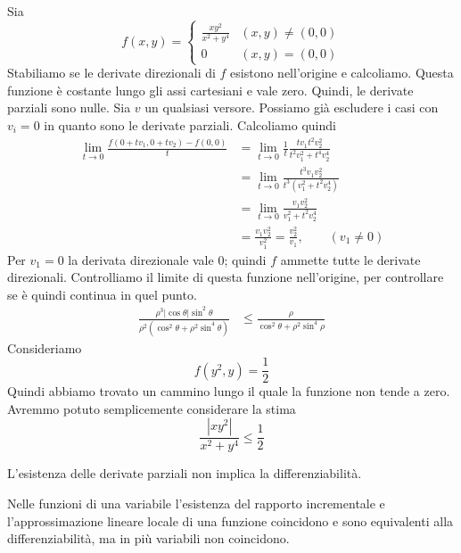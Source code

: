 \documentclass[a4paper]{article}
\begin{document}
\begin{radioactive}
\begin{snippetexample}{}
    Sia \[
        f(x,y) = \begin{cases}
            \frac{xy^2}{x^2 + y^4} & (x,y) \neq (0,0) \\
            0 & (x,y) = (0,0)
        \end{cases}
    \]
    Stabiliamo se le derivate direzionali
    di \(f\) esistono nell'origine e calcoliamo.
    Questa funzione è costante lungo gli assi cartesiani e vale zero.
    Quindi, le derivate parziali sono nulle.
    Sia \(v\) un qualsiasi versore. Possiamo già escludere i casi
    con \(v_i = 0\) in quanto sono le derivate parziali.
    Calcoliamo quindi
    \begin{align*}
        \lim_{t\to 0} \frac{f(0 + tv_1, 0 + tv_2) - f(0,0)}{t}
        &= \lim_{t\to 0}
        \frac{1}{t} \frac{tv_1 t^2 v_2^2}{t^2v_1^2 + t^4v_2^4} \\
        &= \lim_{t\to 0} \frac{t^3 v_1v_2^2}{t^3(v_1^2 + t^2v_2^4)} \\
        &= \lim_{t\to 0} \frac{v_1v_2^2}{v_1^2 + t^2v_2^4} \\
        &= \frac{v_1v_2^2}{v_1^2} = \frac{v_2^2}{v_1}, \qquad (v_1\neq0)
    \end{align*}
    Per \(v_1=0\) la derivata direzionale vale \(0\); quindi \(f\) ammette tutte le derivate direzionali.
    Controlliamo il limite di questa funzione nell'origine, per controllare
    se è quindi continua in quel punto.
    \begin{align*}
        \frac{\rho^3 |\cos\theta| \sin^2\theta}{
            \rho^2 (\cos^2 \theta + \rho^2 \sin^4 \theta)
        }
        &\leq \frac{\rho}{\cos^2\theta + \rho^2 \sin^4 \rho}
    \end{align*}
    Consideriamo
    \[
        f(y^2, y) = \frac{1}{2}
    \]
    Quindi abbiamo trovato un cammino lungo il quale la funzione non tende a zero.
    Avremmo potuto semplicemente considerare la stima
    \[
        \frac{|xy^2|}{x^2 + y^4} \leq \frac{1}{2}
    \]
\end{snippetexample}

L'esistenza delle derivate parziali
non implica la differenziabilità.

Nelle funzioni di una variabile l'esistenza del rapporto incrementale
e l'approssimazione lineare locale di una funzione coincidono e sono equivalenti alla
differenziabilità, ma in più variabili non coincidono.
\end{radioactive}
\end{document}

